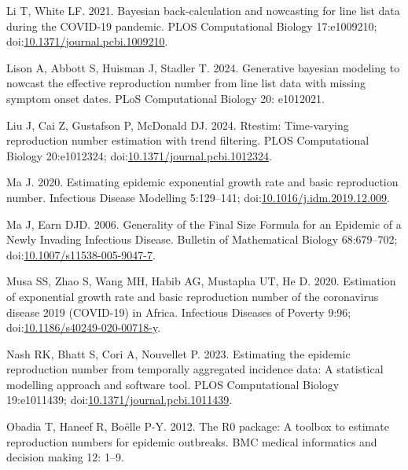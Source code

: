 \documentclass[
  letterpaper,
  DIV=11,
  numbers=noendperiod]{scrreprt}
\newlength{\cslhangindent}
\newenvironment{CSLReferences}[2] %
 {\begin{list}{}{%
  \setlength{\itemindent}{0pt}
  \setlength{\leftmargin}{0pt}
  \setlength{\parsep}{0pt}
  \ifodd #1
   \setlength{\leftmargin}{\cslhangindent}
   \setlength{\itemindent}{-1\cslhangindent}
  \fi
  \setlength{\itemsep}{#2\baselineskip}}}
 {\end{list}}
\begin{document}
\begin{CSLReferences}{1}{1}
Li T, White LF. 2021. Bayesian back-calculation and nowcasting for line
list data during the {COVID}-19 pandemic. PLOS Computational Biology
17:e1009210;
doi:\href{https://doi.org/10.1371/journal.pcbi.1009210}{10.1371/journal.pcbi.1009210}.

Lison A, Abbott S, Huisman J, Stadler T. 2024. Generative bayesian
modeling to nowcast the effective reproduction number from line list
data with missing symptom onset dates. PLoS Computational Biology 20:
e1012021.

Liu J, Cai Z, Gustafson P, McDonald DJ. 2024. Rtestim: Time-varying
reproduction number estimation with trend filtering. PLOS Computational
Biology 20:e1012324;
doi:\href{https://doi.org/10.1371/journal.pcbi.1012324}{10.1371/journal.pcbi.1012324}.

Ma J. 2020. Estimating epidemic exponential growth rate and basic
reproduction number. Infectious Disease Modelling 5:129--141;
doi:\href{https://doi.org/10.1016/j.idm.2019.12.009}{10.1016/j.idm.2019.12.009}.

Ma J, Earn DJD. 2006. Generality of the {Final} {Size} {Formula} for an
{Epidemic} of a {Newly} {Invading} {Infectious} {Disease}. Bulletin of
Mathematical Biology 68:679--702;
doi:\href{https://doi.org/10.1007/s11538-005-9047-7}{10.1007/s11538-005-9047-7}.

Musa SS, Zhao S, Wang MH, Habib AG, Mustapha UT, He D. 2020. Estimation
of exponential growth rate and basic reproduction number of the
coronavirus disease 2019 ({COVID}-19) in {Africa}. Infectious Diseases
of Poverty 9:96;
doi:\href{https://doi.org/10.1186/s40249-020-00718-y}{10.1186/s40249-020-00718-y}.

Nash RK, Bhatt S, Cori A, Nouvellet P. 2023. Estimating the epidemic
reproduction number from temporally aggregated incidence data: A
statistical modelling approach and software tool. PLOS Computational
Biology 19:e1011439;
doi:\href{https://doi.org/10.1371/journal.pcbi.1011439}{10.1371/journal.pcbi.1011439}.

Obadia T, Haneef R, Boëlle P-Y. 2012. The R0 package: A toolbox to
estimate reproduction numbers for epidemic outbreaks. BMC medical
informatics and decision making 12: 1--9.


\end{CSLReferences}
\end{document}
